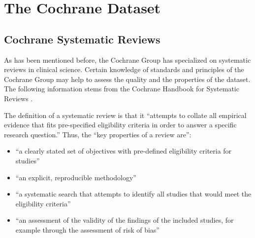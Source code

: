 \documentclass[11pt,a4paper,twoside]{book}\usepackage[]{graphicx}\usepackage[]{color}
\makeatletter
\newenvironment{kframe}{%
 \def\at@end@of@kframe{}%
 \ifinner\ifhmode%
  \def\at@end@of@kframe{\end{minipage}}%
  \begin{minipage}{\columnwidth}%
 \fi\fi%
 \def\FrameCommand##1{\hskip\@totalleftmargin \hskip-\fboxsep
 \colorbox{shadecolor}{##1}\hskip-\fboxsep
     \hskip-\linewidth \hskip-\@totalleftmargin \hskip\columnwidth}%
 \MakeFramed {\advance\hsize-\width
   \@totalleftmargin\z@ \linewidth\hsize
   \@setminipage}}%
 {\par\unskip\endMakeFramed%
 \at@end@of@kframe}
\newenvironment{knitrout}{}{} %
\makeatother
\begin{document}







\begin{knitrout}
\color{fgcolor}\begin{kframe}


{\ttfamily\noindent\itshape{}}\end{kframe}
\end{knitrout}




\chapter{The Cochrane Dataset} 


\section{Cochrane Systematic Reviews}
As has been mentioned before, the Cochrane Group has specialized on systematic reviews in clinical science. Certain knowledge of standards and principles of the Cochrane Group may help to assess the quality and the properties of the dataset. The following information stems from the Cochrane Handbook for Systematic Reviews \citep{cochrane.handbook}.

\vspace{0mm}
The definition of a systematic review is that it ``attempts to collate all empirical evidence that fits pre-specified eligibility criteria in order to answer a specific research question.'' Thus, the ``key properties of a review are'':

\begin{itemize}
\item``a clearly stated set of objectives with pre-defined eligibility criteria for studies''
\item ``an explicit, reproducible methodology''
\item ``a systematic search that attempts to identify all studies that would meet the eligibility criteria''
\item ``an assessment of the validity of the findings of the included studies, for example through the assessment of risk of bias''
\end{itemize}
\end{document}
